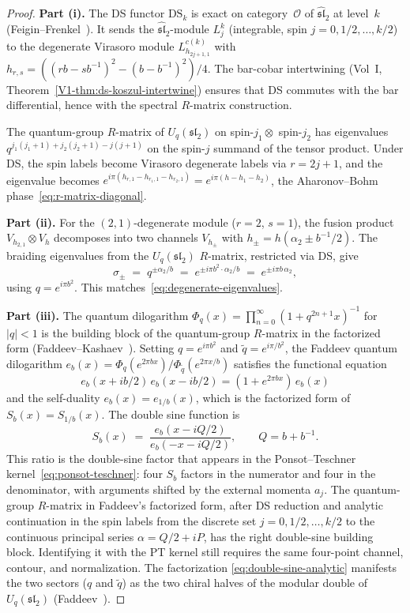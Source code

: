 \begin{proof}
\textbf{Part (i).}
The DS functor $\mathrm{DS}_k$ is exact on category~$\mathcal{O}$
of $\widehat{\mathfrak{sl}}_2$ at level~$k$
(Feigin--Frenkel~\cite{FrenkelBenZvi}). It sends the
$\widehat{\mathfrak{sl}}_2$-module $L_j^k$ (integrable, spin
$j = 0, 1/2, \ldots, k/2$) to the degenerate Virasoro module
$L_{h_{2j+1,1}}^{c(k)}$ with $h_{r,s} = ((r b - s b^{-1})^2 -
(b - b^{-1})^2)/4$. The bar-cobar intertwining
(Vol~I, Theorem~\ref*{V1-thm:ds-koszul-intertwine}) ensures that
DS commutes with the bar differential, hence with the spectral
$R$-matrix construction.

The quantum-group $R$-matrix of $U_q(\mathfrak{sl}_2)$ on
spin-$j_1 \otimes$ spin-$j_2$ has eigenvalues
$q^{j_1(j_1+1) + j_2(j_2+1) - j(j+1)}$
on the spin-$j$ summand of the tensor product. Under DS, the spin
labels become Virasoro degenerate labels via $r = 2j+1$, and the
eigenvalue becomes
$e^{i\pi(h_{r,1} - h_{r_1,1} - h_{r_2,1})} = e^{i\pi(h -
h_1 - h_2)}$, the Aharonov--Bohm phase~\eqref{eq:r-matrix-diagonal}.

\medskip
\textbf{Part (ii).}
For the $(2,1)$-degenerate module ($r = 2$, $s = 1$), the fusion
product $V_{h_{2,1}} \otimes V_{h}$ decomposes into two channels
$V_{h_\pm}$ with $h_\pm = h({\alpha_2 \pm b^{-1}/2})$. The
braiding eigenvalues from the $U_q(\mathfrak{sl}_2)$ $R$-matrix,
restricted via DS, give
\[
\sigma_\pm
\;=\;
q^{\pm \alpha_2/b}
\;=\;
e^{\pm i\pi b^2 \cdot \alpha_2/b}
\;=\;
e^{\pm i\pi b\,\alpha_2},
\]
using $q = e^{i\pi b^2}$.
This matches~\eqref{eq:degenerate-eigenvalues}.

\medskip
\textbf{Part (iii).}
The quantum dilogarithm $\Phi_q(x) = \prod_{n=0}^{\infty}
(1 + q^{2n+1} x)^{-1}$ for $|q| < 1$ is the building block of
the quantum-group $R$-matrix in the factorized form
(Faddeev--Kashaev~\cite{FaddeevKashaev}). Setting
$q = e^{i\pi b^2}$ and $\tilde q = e^{i\pi/b^2}$, the
Faddeev quantum dilogarithm $e_b(x) = \Phi_q(e^{2\pi bx}) /
\Phi_{\tilde q}(e^{2\pi x/b})$ satisfies the functional equation
\[
e_b(x + ib/2)\,e_b(x - ib/2) = (1 + e^{2\pi bx})\,e_b(x)
\]
and the self-duality $e_b(x) = e_{1/b}(x)$, which is the
factorized form of $S_b(x) = S_{1/b}(x)$. The double sine
function is
\begin{equation}\label{eq:Sb-dilog}
S_b(x) \;=\; \frac{e_b(x - iQ/2)}{e_b(-x - iQ/2)},
\qquad Q = b + b^{-1}.
\end{equation}
This ratio is the double-sine factor that appears in the
Ponsot--Teschner kernel~\eqref{eq:ponsot-teschner}: four $S_b$ factors
in the numerator and four in the denominator, with arguments shifted by
the external momenta $a_j$. The quantum-group $R$-matrix in Faddeev's
factorized form, after DS reduction and analytic continuation in the
spin labels from the discrete set $j = 0, 1/2, \ldots, k/2$ to the
continuous principal series $\alpha = Q/2 + iP$, has the right
double-sine building block. Identifying it with the PT kernel still
requires the same four-point channel, contour, and normalization. The
factorization \eqref{eq:double-sine-analytic}
manifests the two sectors ($q$ and $\tilde q$) as the two chiral
halves of the modular double of $U_q(\mathfrak{sl}_2)$
(Faddeev~\cite{Faddeev99}).
\end{proof}

